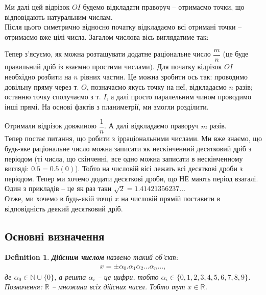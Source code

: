 \documentclass[a4paper, 14pt]{article}
\theoremstyle{theoremdd}
\theoremstyle{theoremdd}
\newtheorem{definition}[theorem]{Definition}
\theoremstyle{theoremdd}
\theoremstyle{theoremdd}
\theoremstyle{theoremdd}
\theoremstyle{theoremdd}
\theoremstyle{theoremdd}
\theoremstyle{theoremdd}
\begin{document}
Ми далі цей відрізок $OI$ будемо відкладати праворуч -- отримаємо точки, що відповідають натуральним числам.\\
Після цього симетрично відносно початку відкладаємо всі отримані точки -- отримаємо вже цілі числа. Загалом числова вісь виглядатиме так:
	\begin{figure}[H]
	\centering
	\end{figure}
	Тепер з'ясуємо, як можна розташувати додатне раціональне число $\dfrac{m}{n}$ (це буде правильний дріб із взаємно простими числами). Для початку відрізок $OI$ необхідно розбити на $n$ рівних частин. Це можна зробити ось так: проводимо довільну пряму через т. $O$, позначаємо якусь точку на неї, відкладаємо $n$ разів; останню точку сполучаємо з т. $I$, а далі просто паралельним чином проводимо інші прямі. На основі фактів з планиметрії, ми змогли розділити.
	\begin{figure}[H]
	\centering
	\end{figure}
	Отримали відрізок довжиною $\dfrac{1}{n}$. А далі відкладаємо праворуч $m$ разів.\\
	Тепер постає питання, що робити з ірраціональними числами. Ми вже знаємо, що будь-яке раціональне число можна записати як нескінченний десятковий дріб з періодом (ті числа, що скінченні, все одно можна записати в нескінченному вигляді: $0.5 = 0.5(0)$). Тобто на числовій вісі лежать всі десяткові дроби з періодом. Тепер ми хочемо додати десяткові дроби, що НЕ мають період взагалі. Один з прикладів -- це як раз таки $\sqrt{2} = 1.41421356237 \dots$\\
	Отже, ми хочемо в будь-якій точці $x$ на числовій прямій поставити в відповідність деякий десятковий дріб.
	
	\subsection{Основні визначення}
	\begin{definition}
	\textbf{Дійсним числом} назвемо такий об'єкт:
	\begin{align*}
	x = \pm \alpha_0.\alpha_1 \alpha_2 \dots \alpha_n \dots,
	\end{align*}
	де $\alpha_0 \in \mathbb{N} \cup \{0\}$, а решта $\alpha_i$ -- це цифри, тобто $\alpha_i \in \{0,1,2,3,4,5,6,7,8,9\}$.\\
	Позначення: $\mathbb{R}$ -- множина всіх дійсних чисел. Тобто тут $x \in \mathbb{R}$.
	\end{definition}
	
\end{document}
